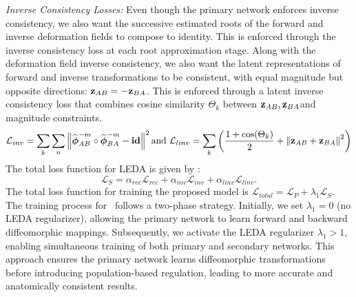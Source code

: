 \vspace{0.05in}
\noindent \textit{Inverse Consistency Losses:} Even though the primary network enforces inverse consistency, we also want the successive estimated roots of the forward and inverse deformation fields to compose to identity. This is enforced through the inverse consistency loss at each root approximation stage. Along with the deformation field inverse consistency, we also want the latent representations of forward and inverse transformations to be consistent, with equal magnitude but opposite directions: \(\mathbf{z}_{AB} = -\mathbf{z}_{BA}\). This is enforced through a latent inverse consistency loss that combines cosine similarity \(\Theta_k\) between \(\mathbf{z}_{AB}, \mathbf{z}_{BA}\)and magnitude constraints.
\begin{equation}
\mathcal{L}_{inv} = \sum_k \sum_n \left\| \widehat{{\boldsymbol{\phi}}}_{AB}^{-m} \circ \widehat{{\boldsymbol{\phi}}}_{BA}^{-m} - \mathbf{id} \right\|^2 \text{and } \mathcal{L}_{linv} = \sum_k \left(\frac{1 + \cos(\Theta_k)}{2} + \left\|\mathbf{z}_{AB} + \mathbf{z}_{BA}\right\|^2\right)
\end{equation}
The total loss function for LEDA is given by :
\begin{equation} \label{leda_loss}
\mathcal{L}_{S} = \alpha_{rec}\mathcal{L}_{rec} + \alpha_{inv}\mathcal{L}_{inv} + \alpha_{linv}\mathcal{L}_{linv}.
\end{equation}
The total loss function for training the proposed model is \(\mathcal{L}_{total} =  \mathcal{L}_{P} + \lambda_1\mathcal{L}_{S} \). The training process for \model~follows a two-phase strategy. Initially, we set \(\lambda_1 = 0\) (no LEDA regularizer), allowing the primary network to learn forward and backward diffeomorphic mappings. Subsequently, we activate the LEDA regularizer \(\lambda_1>1\), enabling simultaneous training of both primary and secondary networks. This approach ensures the primary network learns diffeomorphic transformations before introducing population-based regulation, leading to more accurate and anatomically consistent results.

